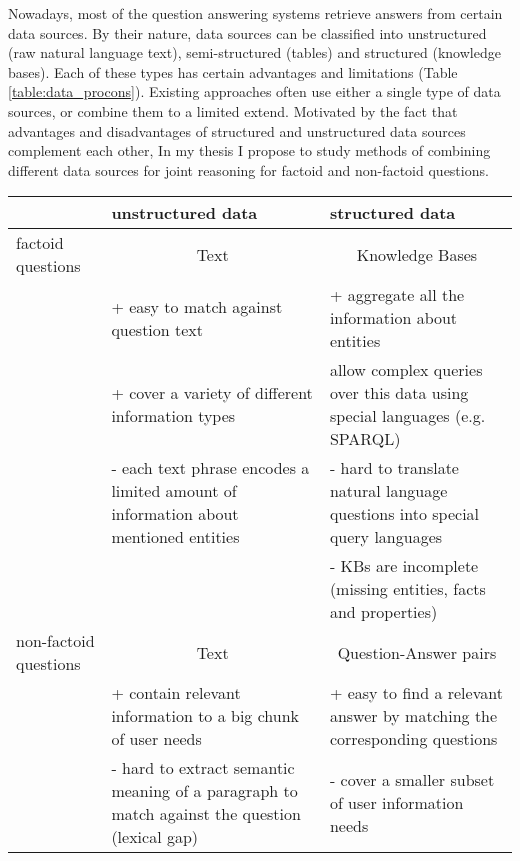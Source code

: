 Nowadays, most of the question answering systems retrieve answers from certain data sources.
By their nature, data sources can be classified into unstructured (\eg raw natural language text), semi-structured (\eg tables) and structured (\eg knowledge bases).
Each of these types has certain advantages and limitations (Table \ref{table:data_procons}).
Existing approaches often use either a single type of data sources, or combine them to a limited extend.
Motivated by the fact that advantages and disadvantages of structured and unstructured data sources complement each other, In my thesis I propose to study methods of combining different data sources for joint reasoning for factoid and non-factoid questions.

\begin{table*}
\centering
\caption{Pros and cons of structured and unstructured data sources for factoid and non-factoid question answering}
\begin{tabular}{| l | p{6cm} | p{6cm} |}
\hline
 & unstructured data & structured data \\
\hline
factoid questions & \multicolumn{1}{|c|}{Text} & \multicolumn{1}{|c|}{Knowledge Bases} \\
 & + easy to match against question text & + aggregate all the information about entities\\
 & + cover a variety of different information types & allow complex queries over this data using special languages (e.g. SPARQL) \\
 & - each text phrase encodes a limited amount of information about mentioned entities & - hard to translate natural language questions into special query languages \\
&  & - KBs are incomplete (missing entities, facts and properties) \\
\hline
non-factoid questions & \multicolumn{1}{|c|}{Text} & \multicolumn{1}{|c|}{Question-Answer pairs} \\
 & + contain relevant information to a big chunk of user needs & + easy to find a relevant answer by matching the corresponding questions \\
 & - hard to extract semantic meaning of a paragraph to match against the question (lexical gap) & - cover a smaller subset of user information needs \\
\hline
\end{tabular}
\label{table:data_procons}
\end{table*}


